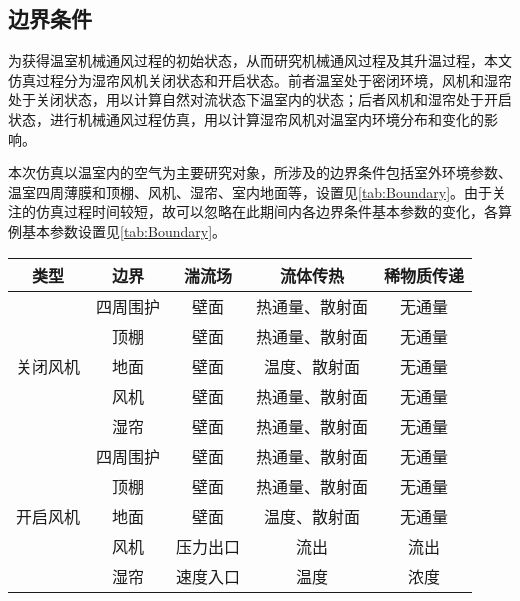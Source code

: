 	\subsection{边界条件}
	为获得温室机械通风过程的初始状态，从而研究机械通风过程及其升温过程，本文仿真过程分为湿帘风机关闭状态和开启状态。前者温室处于密闭环境，风机和湿帘处于关闭状态，用以计算自然对流状态下温室内的状态；后者风机和湿帘处于开启状态，进行机械通风过程仿真，用以计算湿帘风机对温室内环境分布和变化的影响。
	
本次仿真以温室内的空气为主要研究对象，所涉及的边界条件包括室外环境参数、温室四周薄膜和顶棚、风机、湿帘、室内地面等，设置见\ref{tab:Boundary}。由于关注的仿真过程时间较短，故可以忽略在此期间内各边界条件基本参数的变化，各算例基本参数设置见\ref{tab:Boundary}。

		\begin{table}[!hpb]
  			\centering
  			\begin{tabular}{ccccc} \toprule
			类型	 & 边界 & 湍流场 & 	流体传热 & 	稀物质传递\\ \midrule
			\multirow{5}{*}{关闭风机} & 四周围护 & 壁面 & 热通量、散射面 & 无通量\\ 
												  & 顶棚  & 壁面 & 热通量、散射面 & 无通量\\
												  & 地面 & 壁面 & 温度、散射面 & 无通量\\
												  & 风机 & 壁面 & 热通量、散射面 & 无通量\\
												  & 湿帘 & 壁面 & 热通量、散射面 & 无通量\\ \midrule
			\multirow{5}{*}{开启风机} & 四周围护 & 壁面 & 热通量、散射面 & 无通量\\
												  & 顶棚 & 壁面	 & 热通量、散射面	 & 无通量\\
												  & 地面 &  壁面 & 温度、散射面	 & 无通量\\
												  & 风机 &  压力出口 & 	流出 & 	流出\\
												  & 湿帘 & 速度入口	 & 温度 & 浓度\\ \bottomrule
 			\end{tabular}
		\end{table}
		

